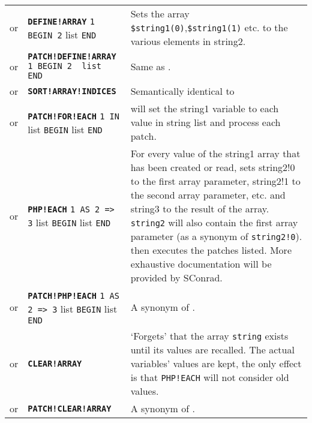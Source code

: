 \documentclass{article}
\def\ttref#1{\ahrefloc{#1}{\tt #1}}
\def\DEFINE#1{{\tt \bf #1}\label{#1}\index{#1}}
\def\t#1{{\tt #1}}
\def\Slist{{\color{red} list }}
\begin{document}
\begin{tabular}{cp{10in}|p{10in}}
or & \DEFINE{DEFINE!ARRAY} \t{\ttref{String}1 BEGIN \ttref{String}2} \Slist \t{END} &
	Sets the array \verb+$string1(0)+,\verb+$string1(1)+ etc. to the various elements in string2.
\\

or & \DEFINE{PATCH!DEFINE!ARRAY} \t{\ttref{String}1 BEGIN \ttref{String}2 \Slist END} &
	Same as \ttref{DEFINE!ARRAY}.
\\

or & \DEFINE{SORT!ARRAY!INDICES} \t{\ttref{String}} &

  Semantically identical to \ttref{ACTION!SORT!ARRAY!INDICES}\\

or & \DEFINE{PATCH!FOR!EACH} \t{\ttref{String}1 IN \ttref{String}} \Slist
                             \t{BEGIN} \ttref{patch} \Slist \t{END} &
    will set the string1 variable to each value in string list and process each patch. \\

or & \DEFINE{PHP!EACH} \t{\ttref{String}1 AS \ttref{String}2 => \ttref{String}3} \Slist
                       \t{BEGIN} \ttref{patch} \Slist \t{END} &
    For every value of the string1 array that has been created or read, sets
    string2!0 to the first array parameter, string2!1 to the second array
    parameter, etc. and string3 to the result of the array. \verb+string2+ will also contain
		the first array parameter (as a synonym of \verb+string2!0+). then executes the
    patches listed. More exhaustive documentation will be provided by SConrad.
\\

or & \DEFINE{PATCH!PHP!EACH} \t{\ttref{String}1 AS \ttref{String}2 => \ttref{String}3} \Slist
                             \t{BEGIN} \ttref{patch} \Slist \t{END} &
    A synonym of \ttref{PHP!EACH}.
\\

or & \DEFINE{CLEAR!ARRAY} \ttref{String} &
    `Forgets' that the array \t{string} exists until its values are recalled.
    The actual variables' values are kept, the only effect is that \t{*PHP!EACH}
    will not consider old values.
\\

or & \DEFINE{PATCH!CLEAR!ARRAY} \ttref{String} &
    A synonym of \ttref{CLEAR!ARRAY}.
\\



\end{tabular}
\end{document}
